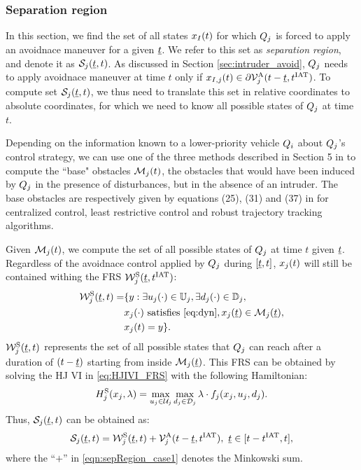 \subsubsection{Separation region} \label{sec:sepRegion_case1}
In this section, we find the set of all states $x_{I}(t)$ for which $Q_j$ is forced to apply an avoidnace maneuver for a given $\underline{t}$. We refer to this set as \textit{separation region}, and denote it as $\mathcal{S}_j(\underline{t}, t)$. As discussed in Section \ref{sec:intruder_avoid}, $Q_j$ needs to apply avoidnace maneuver at time $t$ only if $x_{I, j}(t) \in \partial \mathcal{V}^{\text{A}}_{j}(t-\underline{t}, t^\text{IAT})$. To compute set $\mathcal{S}_j(\underline{t}, t)$, we thus need to translate this set in relative coordinates to absolute coordinates, for which we need to know all possible states of $Q_j$ at time $t$.

Depending on the information known to a lower-priority vehicle $Q_i$ about $Q_j$'s control strategy, we can use one of the three methods described in Section 5 in \cite{chen2016robust} to compute the ``base" obstacles $\mathcal{M}_j(t)$, the obstacles that would have been induced by $Q_j$ in the presence of disturbances, but in the absence of an intruder. The base obstacles are respectively given by equations (25), (31) and (37) in \cite{chen2016robust} for centralized control, least restrictive control and robust trajectory tracking algorithms.

Given $\mathcal{M}_j(t)$, we compute the set of all possible states of $Q_j$ at time $t$ given $\underline{t}$. Regardless of the avoidnace control applied by $Q_j$ during $[\underline{t}, t]$, $x_j(t)$ will still be contained withing the FRS $\mathcal{W}^{\text{S}}_{j}(\underline{t}, t^\text{IAT})$:  
\begin{equation} \label{eq:sepRegionFRS_case1}
\begin{aligned}
\frs_{j}^{\text{S}}(\tsa, t) = & \{y: \exists \ctrl_j(\cdot) \in \cfset_j, \exists \dstb_j(\cdot) \in \dfset_j, \\
& \state_j(\cdot) \text{ satisfies \eqref{eq:dyn}}, \state_j(\tsa) \in \boset_j(\tsa), \\
& \state_j(t) = y\}.
\end{aligned}
\end{equation}
$\mathcal{W}_{j}^{\text{S}}(\underline{t}, t)$ represents the set of all possible states that $Q_j$ can reach after a duration of $(t-\underline{t})$ starting from inside $\mathcal{M}_j(\underline{t})$. This FRS can be obtained by solving the HJ VI in \eqref{eq:HJIVI_FRS} with the following Hamiltonian:
\begin{equation}
H_{j}^{\text{S}}(x_j, \lambda) = \max_{u_j \in \mathcal{U}_j} \max_{d_j \in \mathcal{D}_j} \lambda \cdot f_j (x_j, u_j, d_j).
\end{equation} 
Thus, $\mathcal{S}_j(\underline{t}, t)$ can be obtained as:
\begin{equation} \label{eqn:sepRegion_case1}
\sep_j(\tsa, t) = \frs_{j}^{\text{S}}(\tsa, t) + \brs^{\text{A}}_{j}(t-\tsa, \iat), ~\tsa \in [t-\iat, t],
\end{equation}
where the ``$+$'' in \eqref{eqn:sepRegion_case1} denotes the Minkowski sum.